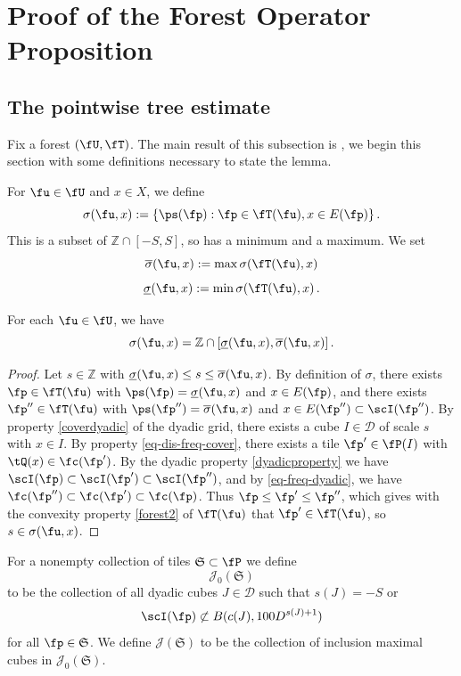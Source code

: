 \chapter{Proof of the Forest Operator Proposition}

\label{treesection}

\section{The pointwise tree estimate}
Fix a forest $(\fU, \fT)$. The main result of this subsection is , we begin this section with some definitions necessary to state the lemma.

For $\fu \in \fU$ and $x\in X$, we define
$$
    \sigma (\fu, x):=\{\ps(\fp):\fp\in \fT(\fu), x\in E(\fp)\}\,.
$$
This is a subset of $\mathbb{Z} \cap [-S, S]$, so has a minimum and a maximum. We set
$$
    \overline{\sigma} (\fu, x) := \max \sigma(\fT(\fu), x)
$$
$$
    \underline{\sigma} (\fu, x) := \min\sigma(\fT(\fu), x)\,.
$$
\begin{lemma}
\label{convex-scales}
    For each $\fu \in \fU$, we have
    $$
        \sigma(\fu, x) = \mathbb{Z} \cap [\underline{\sigma} (\fu, x), \overline{\sigma} (\fu, x)]\,.
    $$
\end{lemma}

\begin{proof}
    Let $s \in \mathbb{Z}$ with $\underline{\sigma} (\fu, x) \le s \le \overline{\sigma} (\fu, x)$. By definition of $\sigma$, there exists $\fp \in \fT(\fu)$ with $\ps(\fp) = \underline{\sigma} (\fu, x)$ and $x \in E(\fp)$, and there exists $\fp'' \in \fT(\fu)$ with $\ps(\fp'') = \overline{\sigma} (\fu, x)$ and $x \in E(\fp'') \subset \scI(\fp'')$. By property \eqref{coverdyadic} of the dyadic grid, there exists a cube $I \in \mathcal{D}$ of scale $s$ with $x \in I$. By property \eqref{eq-dis-freq-cover}, there exists a tile $\fp' \in \fP(I)$ with $\tQ(x) \in \fc(\fp')$. By the dyadic property \eqref{dyadicproperty} we have $\scI(\fp) \subset \scI(\fp') \subset \scI(\fp'')$, and by \eqref{eq-freq-dyadic}, we have $\fc(\fp'') \subset \fc(\fp') \subset \fc(\fp)$. Thus $\fp \le \fp' \le\fp''$, which gives with the convexity property \eqref{forest2} of $\fT(\fu)$ that $\fp' \in \fT(\fu)$, so $s \in \sigma(\fu, x)$.
\end{proof}

For a nonempty collection of tiles $\mathfrak{S} \subset \fP$ we define
$$
    \mathcal{J}_0(\mathfrak{S})
$$
to be the collection of all dyadic cubes $J \in \mathcal{D}$ such that $s(J) = -S$ or
$$
    \scI(\fp) \not\subset B(c(J), 100D^{s(J) + 1})
$$
for all $\fp \in \mathfrak{S}$. We define $\mathcal{J}(\mathfrak{S})$ to be the collection of inclusion maximal cubes in $\mathcal{J}_0(\mathfrak{S})$.

